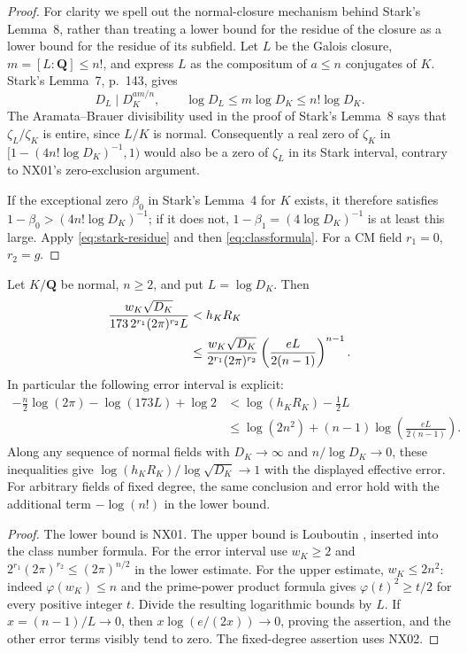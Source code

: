 \begin{proof}
For clarity we spell out the normal-closure mechanism behind Stark's
Lemma~8, rather than treating a lower bound for the residue of the
closure as a lower bound for the residue of its subfield.
Let $L$ be the Galois closure, $m=[L:\mathbf Q]\leq n!$, and express $L$
as the compositum of $a\leq n$ conjugates of $K$. Stark's Lemma~7,
p.~143, gives
\[
 D_L\mid D_K^{am/n},\qquad \log D_L\leq m\log D_K\leq n!\log D_K.
\]
The Aramata--Brauer divisibility used in the proof of Stark's
Lemma~8 says that $\zeta_L/\zeta_K$ is entire, since $L/K$ is normal.
Consequently a real zero of $\zeta_K$ in
$[1-(4n!\log D_K)^{-1},1)$ would also be a zero of $\zeta_L$ in its
Stark interval, contrary to NX01's zero-exclusion argument.

If the exceptional zero $\beta_0$ in Stark's Lemma~4 for $K$ exists,
it therefore satisfies $1-\beta_0>(4n!\log D_K)^{-1}$; if it does not,
$1-\beta_1=(4\log D_K)^{-1}$ is at least this large.
Apply \eqref{eq:stark-residue} and then
\eqref{eq:classformula}. For a CM field $r_1=0$, $r_2=g$.
\end{proof}

\begin{theorem}
\label{NX03}
Let $K/\mathbf Q$ be normal, $n\geq2$, and put $L=\log D_K$. Then
\begin{align}
 \frac{w_K\sqrt{D_K}}{173\,2^{r_1}(2\pi)^{r_2}L}
 &<h_KR_K\notag\\
 &\leq\frac{w_K\sqrt{D_K}}{2^{r_1}(2\pi)^{r_2}}
       \left(\frac{eL}{2(n-1)}\right)^{n-1}.
 \label{eq:effective-BS}
\end{align}
In particular the following error interval is explicit:
\begin{align*}
 -\frac n2\log(2\pi)-\log(173L)+\log2
 &<\log(h_KR_K)-\frac12L\\
 &\leq\log(2n^2)+(n-1)\log\left(\frac{eL}{2(n-1)}\right).
\end{align*}
Along any sequence of normal fields with $D_K\to\infty$ and
$n/\log D_K\to0$, these inequalities give
$\log(h_KR_K)/\log\sqrt{D_K}\to1$ with the displayed effective error.
For arbitrary fields of fixed degree, the same conclusion and error
hold with the additional term $-\log(n!)$ in the lower bound.
\end{theorem}

\begin{proof}
The lower bound is NX01. The upper bound is Louboutin
\cite[Theorem~1(1), p.~1195]{NC-Louboutin2001}, inserted into the class number
formula. For the error interval use $w_K\geq2$ and
$2^{r_1}(2\pi)^{r_2}\leq(2\pi)^{n/2}$ in the lower estimate.
For the upper estimate, $w_K\leq2n^2$: indeed
$\varphi(w_K)\leq n$ and the prime-power product formula gives
$\varphi(t)^2\geq t/2$ for every positive integer $t$.
Divide the resulting logarithmic bounds by $L$. If $x=(n-1)/L\to0$,
then $x\log(e/(2x))\to0$, proving the assertion, and the other error
terms visibly tend to zero. The fixed-degree assertion uses NX02.
\end{proof}

